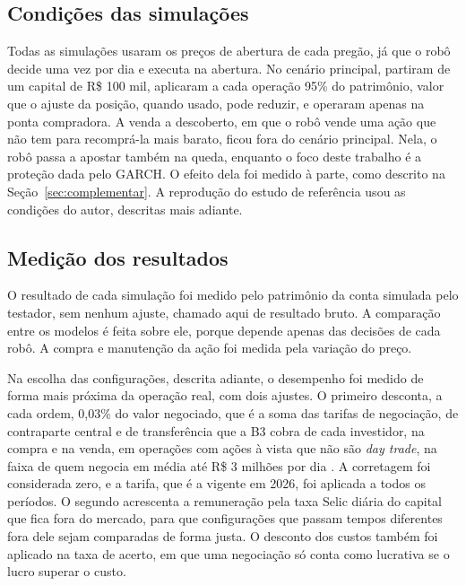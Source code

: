 \subsection{Condições das simulações}

Todas as simulações usaram os preços de abertura de cada pregão, já que o robô
decide uma vez por dia e executa na abertura. No cenário principal, partiram de um
capital de R\$ 100 mil, aplicaram a cada operação 95\% do patrimônio, valor que
o ajuste da posição, quando usado, pode reduzir, e operaram apenas na ponta
compradora. A venda a descoberto, em que o robô vende uma ação que
não tem para recomprá-la mais barato, ficou fora do cenário principal. Nela, o
robô passa a apostar também na queda, enquanto o foco deste trabalho é a proteção
dada pelo GARCH.
O efeito dela foi medido à parte, como descrito na Seção~\ref{sec:complementar}. A reprodução do
estudo de referência usou as condições do autor, descritas mais adiante.

\subsection{Medição dos resultados}

O resultado de cada simulação foi medido pelo patrimônio da conta simulada pelo
testador, sem nenhum ajuste, chamado aqui de resultado bruto. A comparação entre
os modelos é feita sobre ele, porque depende apenas das decisões de cada robô. A
compra e manutenção da ação foi medida pela variação do preço.

Na escolha das configurações, descrita adiante, o desempenho foi medido de forma
mais próxima da operação real, com dois ajustes. O primeiro desconta, a cada ordem,
0,03\% do valor negociado, que é a soma das tarifas de negociação, de contraparte
central e de transferência que a B3 cobra de cada investidor, na compra e na venda,
em operações com ações à vista que não são \textit{day trade}, na faixa de quem
negocia em média até R\$ 3 milhões por dia \cite{b3Tarifas}. A corretagem foi
considerada zero, e a tarifa, que é a vigente em 2026, foi aplicada a todos os
períodos. O segundo acrescenta a remuneração pela taxa Selic diária do capital que
fica fora do mercado, para que configurações que passam tempos diferentes fora
dele sejam comparadas de forma justa. O desconto dos custos também foi aplicado
na taxa de acerto, em que uma negociação só conta como lucrativa se o lucro superar
o custo.

